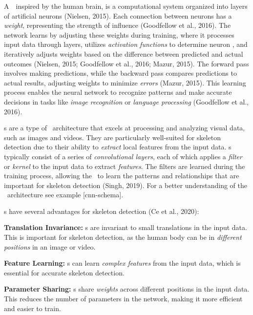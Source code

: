 
A~\NN\, inspired by the human brain, is a computational system organized into layers of artificial neurons (\scc Nielsen, 2015). Each connection between neurons has a {\em weight}, representing the strength of influence (\scc Goodfellow et al., 2016). The network learns by adjusting these weights during training, where it processes input data through layers, utilizes {\em activation functions} to determine neuron , and iteratively adjusts weights based on the difference between predicted and actual outcomes (\scc Nielsen, 2015; \scc Goodfellow et al., 2016; \scc Mazur, 2015). The forward pass involves making predictions, while the backward pass compares predictions to actual results, adjusting weights to minimize {\em errors} (\scc Mazur, 2015). This learning process enables the neural network to recognize patterns and make accurate decisions in tasks like {\em image recognition} or {\em language processing} (\scc Goodfellow et al., 2016).

\CNN\-s are a type of \NN\ architecture that excels at processing and analyzing visual data, such as images and videos. They are particularly well-suited for skeleton detection due to their ability to {\em extract} local features from the input data. \CNN\-s typically consist of a series of {\em convolutional layers}, each of which applies a {\em filter} or {\em kernel} to the input data to extract {\em features}. The filters are learned during the training process, allowing the \CNN\ to learn the patterns and relationships that are important for skeleton detection (\scc Singh, 2019). For a better understanding of the \CNN\ architecture see example [cnn-schema].

\CNN\-s have several advantages for skeleton detection (\scc Ce et al., 2020):

\startitemize[1]
    \item {\bf Translation Invariance:} \CNN\-s are invariant to small translations in the input data. This is important for skeleton detection, as the human body can be in {\em different positions} in an image or video.
    \item {\bf Feature Learning:} \CNN\-s can learn {\em complex features} from the input data, which is essential for accurate skeleton detection.
    \item {\bf Parameter Sharing:} \CNN\-s share {\em weights} across different positions in the input data. This reduces the number of parameters in the network, making it more efficient and easier to train.
\stopitemize

